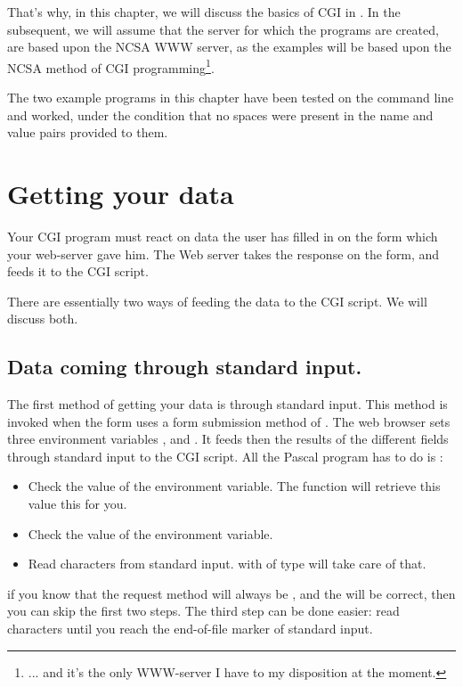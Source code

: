 \documentclass{report}
\begin{document}
That's why, in this chapter, we will discuss the basics of CGI in \fpc.
In the subsequent, we will assume that the server for which the programs are 
created, are based upon the NCSA  WWW server, as the examples
will be based upon the NCSA method of CGI programming\footnote{... and it's 
the only WWW-server I have to my disposition at the moment.}.

The two example programs in this chapter have been tested on the command line 
and worked, under the condition that no spaces were present in the name and 
value pairs provided to them.

\section{Getting your data}
Your CGI program must react on data the user has filled in on the form which
your web-server gave him. The Web server takes the response on the form, and
feeds it to the CGI script.

There are essentially two ways of feeding the data to the CGI script. We will
discuss both.

%
%

\subsection{Data coming through standard input.}
The first method of getting your data is through standard input. This method
is invoked when the form uses a form submission method of .
The web browser sets three environment variables ,
 and . It feeds then the results of
the different fields through standard input to the CGI script.
All the Pascal program has to do is :
\begin{itemize}
\item Check the value of the  environment variable. The
 function will retrieve this value this for you.
\item Check the value of the  environment variable.
\item Read  characters from standard input.  with  of type  will take care of that.
\end{itemize}
if you know that the request method will always be , and the
 will be correct, then you can skip the first two steps.
The third step can be done easier: read characters until you reach the
end-of-file marker of standard input.
\end{document}

